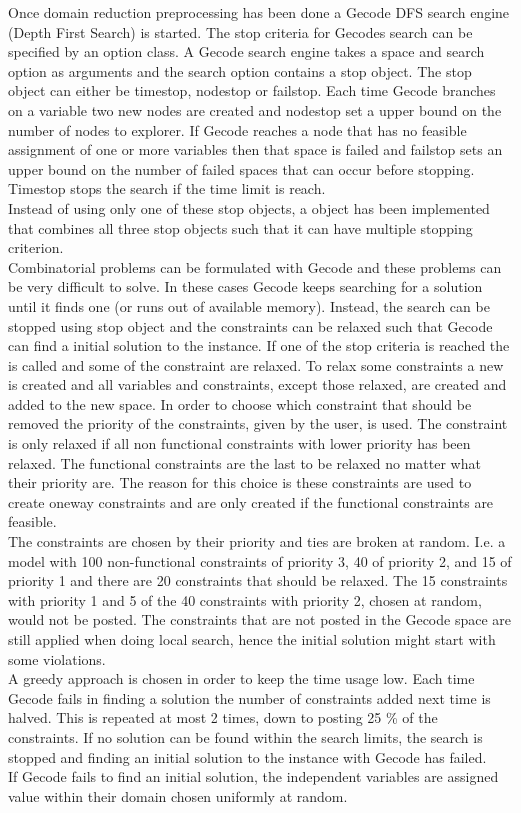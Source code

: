 Once domain reduction preprocessing has been done a Gecode DFS search engine (Depth First Search) is started. The stop 
criteria for Gecodes search can be specified by an option class. A Gecode search engine takes a space and search 
option as arguments and the search option contains a stop object. The stop object can either be timestop, nodestop or 
failstop. Each time Gecode branches on a variable two new nodes are created and nodestop set a upper bound on the 
number of nodes to explorer. If Gecode reaches a node that has no feasible assignment of one or more variables then 
that space is failed and failstop sets an upper bound on the number of failed spaces that can occur before stopping. 
Timestop stops the search if the time limit is reach. \\ 
Instead of using only one of these stop objects, a  object has been implemented that combines all 
three stop objects such that it can have multiple stopping criterion. \\ 
Combinatorial problems can be formulated with Gecode and these problems can be very difficult to solve. In these cases 
Gecode keeps searching for a solution until it finds one (or runs out of available memory). Instead, the search can be 
stopped using stop object and the constraints can be relaxed such that Gecode can find a initial solution to the 
instance. If one of the stop criteria is reached the  is called and some of the constraint are relaxed. To 
relax some constraints a new  is created and all variables and constraints, except those relaxed, 
are created and added to the new space. In order to choose which constraint that should be removed the priority of the 
constraints, given by the user, is used. The constraint is only relaxed if all non functional constraints with lower 
priority has been relaxed. The functional constraints are the last to be relaxed no matter what their priority are. The 
reason for this choice is these constraints are used to create oneway constraints and are only created if the 
functional constraints are feasible. \\
The constraints are chosen by their priority and ties are broken at random. I.e. a model with 100 
non-functional constraints of 
priority 3, 40 of priority 2, and 15 of priority 1 and there are 20 constraints that should be relaxed. The 15 
constraints with priority 1 and 5 of the 40 constraints with priority 2, chosen at random, would not be posted. The 
constraints that are not posted in the Gecode space are still applied when doing local search, hence the initial 
solution might start with some violations.  \\
A greedy approach is chosen in order to keep the time usage low. Each time Gecode fails in finding a solution the number 
of constraints added next time is halved. This is repeated at most 2 times, down to posting 25 \% of the constraints. If 
no solution can be found within the search 
limits, the search is stopped and finding an initial solution to the instance with Gecode has failed.  \\
If Gecode fails to find an initial solution, the independent variables are assigned value within their domain chosen 
uniformly at random. 